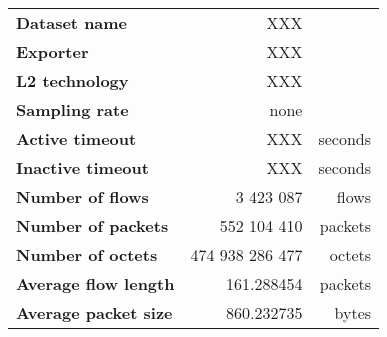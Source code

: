 \begin{tabular}{@{}lrr@{}}
\toprule
\textbf{Dataset name} & XXX & \\
\textbf{Exporter} & XXX & \\
\textbf{L2 technology} & XXX & \\
\textbf{Sampling rate} & none & \\
\textbf{Active timeout} & XXX & seconds \\
\textbf{Inactive timeout} & XXX & seconds \\
\midrule
\textbf{Number of flows} & 3 423 087 & flows \\
\textbf{Number of packets} & 552 104 410 & packets \\
\textbf{Number of octets} & 474 938 286 477 & octets \\
\textbf{Average flow length} & 161.288454 & packets \\
\textbf{Average packet size} & 860.232735 & bytes \\
\bottomrule
\end{tabular}


